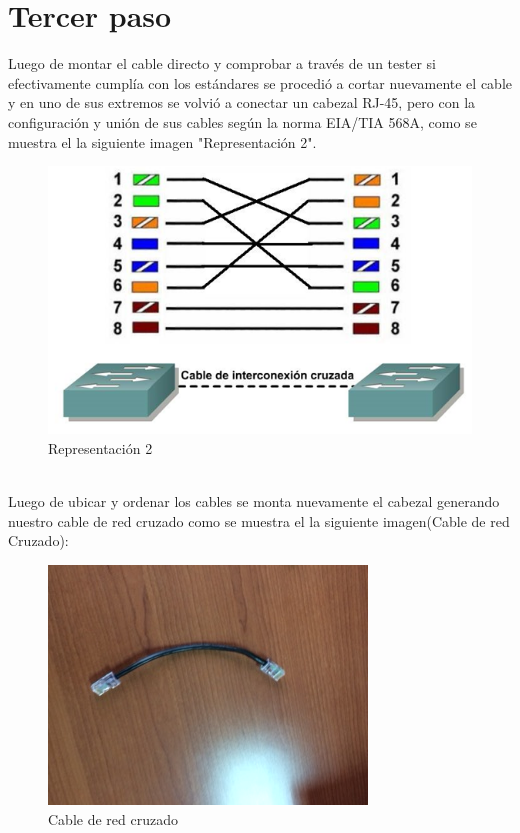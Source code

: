 \documentclass[spanish]{udpreport}
\begin{document}
\section{Tercer paso}
Luego de montar el cable directo y comprobar a través de un tester si efectivamente cumplía con los estándares se procedió a cortar nuevamente el cable y en uno de sus extremos se volvió a conectar un cabezal RJ-45, pero con la configuración y unión de sus cables según la norma EIA/TIA 568A, como se muestra el la siguiente imagen "Representación 2".\\
\begin{figure}[h]
    \centering
    \includegraphics[scale=0.3]{images/cruzad.png}
    \caption{Representación 2}
    \label{fig:my_label}
\end{figure}
\\
Luego de ubicar y ordenar los cables se monta nuevamente el cabezal generando nuestro cable de red cruzado como se muestra el la siguiente imagen(Cable de red Cruzado):
\\
\begin{figure}[h]
    \centering
    \includegraphics{images/image1.jpeg}
    \caption{Cable de red cruzado}
    \label{fig:my_label}
\end{figure}
\newpage
\end{document}
